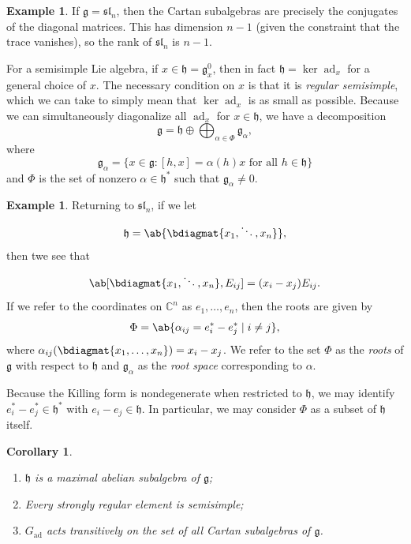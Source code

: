 \documentclass{amsart}
\newtheorem{cor}[thm]{Corollary}
\theoremstyle{definition}
\newtheorem{exm}[thm]{Example}
\theoremstyle{remark}
\theoremstyle{plain}
\theoremstyle{definition}
\theoremstyle{remark}
\newcommand{\C}{\mathbb{C}}
\newcommand{\g}{\mathfrak{g}}
\newcommand{\h}{\mathfrak{h}}
\newcommand{\mf}[1]{\mathfrak{#1}}
\newcommand{\1}{\mathbf{1}}
\newcommand{\2}{\mathbf{2}}
\newcommand{\3}{\mathbf{3}}
\renewcommand{\sl}{\mf{sl}}
\DeclareMathOperator{\ad}{ad}
\begin{document}
\begin{exm}
    If \(\g = \sl_n\), then the Cartan subalgebras are precisely the conjugates of the diagonal matrices. This has dimension \(n-1\) (given the constraint that the trace vanishes), so the rank of \(\sl_n\) is \(n-1\).
\end{exm}

For a semisimple Lie algebra, if \(x \in \h = \g_x^0\), then in fact \(\h = \ker \ad_x\) for a general choice of \(x\). The necessary condition on \(x\) is that it is \textit{regular semisimple}, which we can take to simply mean that \(\ker \ad_x\) is as small as possible. Because we can simultaneously diagonalize all \(\ad_x\) for \(x \in \h\), we have a decomposition
\[ \g = \h \oplus \bigoplus_{\alpha \in \Phi} \g_{\alpha}, \]
where
\[ \g_{\alpha} = \{ x \in \g : [h,x] = \alpha(h) x \text{ for all } h \in \h \} \]
and \(\Phi\) is the set of nonzero \(\alpha \in \h^*\) such that \(\g_{\alpha} \neq 0\). 

\begin{exm}
    Returning to \(\sl_n\), if we let
    \[ \h = \ab\{ \bdiagmat{x_1, \ddots, x_n} \}, \]
    then twe see that 
    \[ \ab[\bdiagmat{x_1, \ddots, x_n}, E_{ij}] = (x_i - x_j) E_{ij}. \]
    If we refer to the coordinates on \(\C^n\) as \(e_1, \ldots, e_n\), then the roots are given by
    \[ \Phi = \ab\{ \alpha_{ij} = e_i^* - e_j^* \mid i \neq j \}, \]
    where \(\alpha_{ij}(\bdiagmat{x_1, \ldots, x_n}) = x_i - x_j\). We refer to the set \(\Phi\) as the \textit{roots} of \(\g\) with respect to \(\h\) and \(\g_{\alpha}\) as the \textit{root space} corresponding to \(\alpha\).
\end{exm}

Because the Killing form is nondegenerate when restricted to \(\h\), we may identify \(e_i^* - e_j^* \in \h^*\) with \(e_i - e_j \in \h\). In particular, we may consider \(\Phi\) as a subset of \(\h\) itself.

\begin{cor}\leavevmode
    \begin{enumerate}
        \item \(\h\) is a maximal abelian subalgebra of \(\g\);
        \item Every strongly regular element is semisimple;
        \item \(G_{\ad}\) acts transitively on the set of all Cartan subalgebras of \(\g\). 
    \end{enumerate}
\end{cor}
\end{document}
